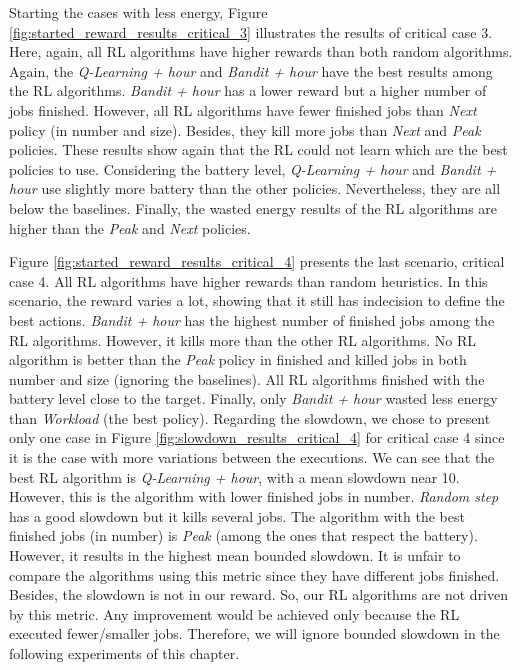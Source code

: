 Starting the cases with less energy, Figure \ref{fig:started_reward_results_critical_3} illustrates the results of critical case 3. Here, again, all RL algorithms have higher rewards than both random algorithms. Again, the \emph{Q-Learning + hour} and \emph{Bandit + hour} have the best results among the RL algorithms. \emph{Bandit + hour} has a lower reward but a higher number of jobs finished. However, all RL algorithms have fewer finished jobs than \emph{Next} policy (in number and size). Besides, they kill more jobs than \emph{Next} and \emph{Peak} policies. These results show again that the RL could not learn which are the best policies to use. Considering the battery level, \emph{Q-Learning + hour} and \emph{Bandit + hour} use slightly more battery than the other policies. Nevertheless, they are all below the baselines. Finally, the wasted energy results of the RL algorithms are higher than the \emph{Peak} and \emph{Next} policies.

Figure \ref{fig:started_reward_results_critical_4} presents the last scenario, critical case 4. All RL algorithms have higher rewards than random heuristics. In this scenario, the reward varies a lot, showing that it still has indecision to define the best actions. \emph{Bandit + hour} has the highest number of finished jobs among the RL algorithms. However, it kills more than the other RL algorithms. No RL algorithm is better than the \emph{Peak} policy in finished and killed jobs in both number and size (ignoring the baselines). All RL algorithms finished with the battery level close to the target. Finally, only \emph{Bandit + hour} wasted less energy than \emph{Workload} (the best policy). Regarding the slowdown, we chose to present only one case in Figure \ref{fig:slowdown_results_critical_4} for critical case 4 since it is the case with more variations between the executions. We can see that the best RL algorithm is \emph{Q-Learning + hour}, with a mean slowdown near 10. However, this is the algorithm with lower finished jobs in number. \emph{Random step} has a good slowdown but it kills several jobs. The algorithm with the best finished jobs (in number) is \emph{Peak} (among the ones that respect the battery). However, it results in the highest mean bounded slowdown. It is unfair to compare the algorithms using this metric since they have different jobs finished. Besides, the slowdown is not in our reward. So, our RL algorithms are not driven by this metric. Any improvement would be achieved only because the RL executed fewer/smaller jobs. Therefore, we will ignore bounded slowdown in the following experiments of this chapter.

